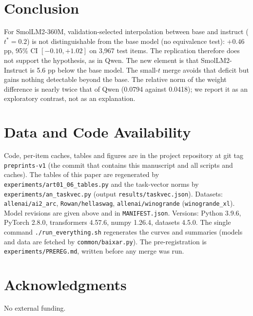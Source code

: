 \documentclass[conference]{IEEEtran}
\begin{document}
\section{Conclusion}
For SmolLM2-360M, validation-selected interpolation between base and instruct ($t^\ast=0.2$) is not distinguishable from the base model (no equivalence test): $+0.46$ pp, 95\% CI $[-0.10,+1.02]$ on 3{,}967 test items. The replication therefore does not support the hypothesis, as in Qwen. The new element is that SmolLM2-Instruct is 5.6 pp below the base model. The small-$t$ merge avoids that deficit but gains nothing detectable beyond the base. The relative norm of the weight difference is nearly twice that of Qwen (0.0794 against 0.0418); we report it as an exploratory contrast, not as an explanation.

\section*{Data and Code Availability}
Code, per-item caches, tables and figures are in the project repository at git tag \texttt{preprints-v1} (the commit that contains this manuscript and all scripts and caches). The tables of this paper are regenerated by \texttt{experiments/art01\_06\_tables.py} and the task-vector norms by \texttt{experiments/an\_taskvec.py} (output \texttt{results/taskvec.json}). Datasets: \texttt{allenai/ai2\_arc}, \texttt{Rowan/hellaswag}, \texttt{allenai/winogrande} (\texttt{winogrande\_xl}). Model revisions are given above and in \texttt{MANIFEST.json}. Versions: Python 3.9.6, PyTorch 2.8.0, transformers 4.57.6, numpy 1.26.4, datasets 4.5.0. The single command \texttt{./run\_everything.sh} regenerates the curves and summaries (models and data are fetched by \texttt{common/baixar.py}). The pre-registration is \texttt{experiments/PREREG.md}, written before any merge was run.

\section*{Acknowledgments}
No external funding.
\end{document}
